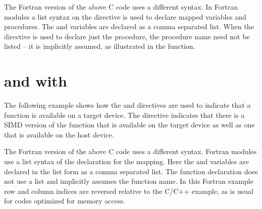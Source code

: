 
The Fortran version of the above C code uses a different syntax. In Fortran modules 
a list syntax on the   directive is used to declare 
mapped variables and procedures. The  and  variables are declared as a comma 
separated list. When the   directive is used to 
declare just the procedure, the procedure name need not be listed -- it is implicitly 
assumed, as illustrated in the  function.


\section{  and    with  }

The following example shows how the   and  
  directives are used to indicate that a function 
is available on a target device. The   directive indicates 
that there is a SIMD version of the function  that is available on the target 
device as well as one that is available on the host device.


The Fortran version of the above C code uses a different syntax. Fortran modules 
use a list syntax of the   declaration for the mapping. 
Here the  and  variables are declared in the list form as a comma separated list. 
The function declaration does not use a list and implicitly assumes the function 
name. In this Fortran example row and column indices are reversed relative to the 
C/C++ example, as is usual for codes optimized for memory access.


